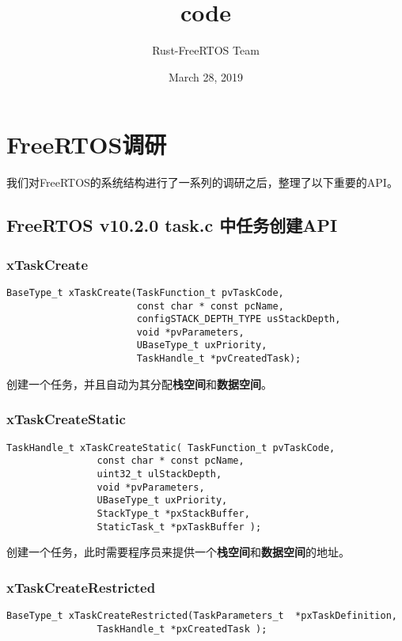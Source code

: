 \documentclass[12pt, a4paper]{article}
\title{code}
\author{Rust-FreeRTOS Team}
\date{March 28, 2019}
\begin{document}
	\section{FreeRTOS调研}
	我们对FreeRTOS的系统结构进行了一系列的调研之后，整理了以下重要的API。
	\subsection{FreeRTOS v10.2.0 task.c 中任务创建API}
	\subsubsection {xTaskCreate}

	\begin{lstlisting}[language={[ANSI]C},keywordstyle=\color{blue!70},commentstyle=\color{red!50!green!50!blue!50},frame=shadowbox, rulesepcolor=\color{red!20!green!20!blue!20}]
BaseType_t xTaskCreate(TaskFunction_t pvTaskCode,
                       const char * const pcName,
                       configSTACK_DEPTH_TYPE usStackDepth,
                       void *pvParameters,
                       UBaseType_t uxPriority,
                       TaskHandle_t *pvCreatedTask);
\end{lstlisting}

创建一个任务，并且自动为其分配\textbf{栈空间}和\textbf{数据空间}。

\subsubsection {xTaskCreateStatic}

\begin{lstlisting}[language={[ANSI]C},keywordstyle=\color{blue!70},commentstyle=\color{red!50!green!50!blue!50},frame=shadowbox, rulesepcolor=\color{red!20!green!20!blue!20}]
TaskHandle_t xTaskCreateStatic( TaskFunction_t pvTaskCode,
				const char * const pcName,
				uint32_t ulStackDepth,
				void *pvParameters,
				UBaseType_t uxPriority,
				StackType_t *pxStackBuffer,
				StaticTask_t *pxTaskBuffer );
\end{lstlisting}
创建一个任务，此时需要程序员来提供一个\textbf{栈空间}和\textbf{数据空间}的地址。

\subsubsection {xTaskCreateRestricted}
\begin{lstlisting}[language={[ANSI]C},keywordstyle=\color{blue!70},commentstyle=\color{red!50!green!50!blue!50},frame=shadowbox, rulesepcolor=\color{red!20!green!20!blue!20}]
BaseType_t xTaskCreateRestricted(TaskParameters_t  *pxTaskDefinition,
				TaskHandle_t *pxCreatedTask );
\end{lstlisting}
\end{document}

